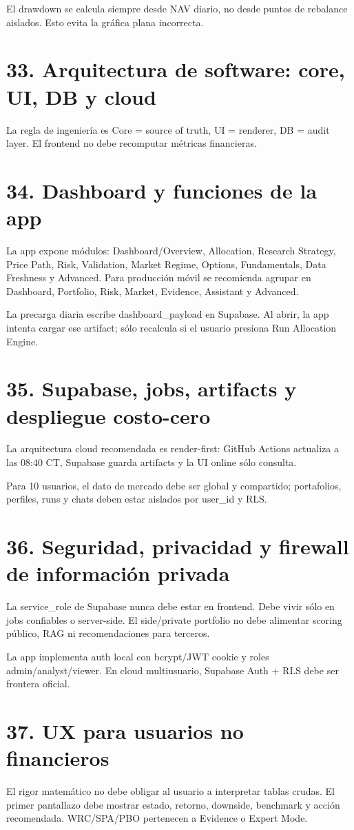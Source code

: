 \documentclass[11pt,letterpaper]{article}
\begin{document}
El drawdown se calcula siempre desde NAV diario, no desde puntos de rebalance aislados. Esto evita la gráfica plana incorrecta.

\section{33. Arquitectura de software: core, UI, DB y cloud}
La regla de ingeniería es Core = source of truth, UI = renderer, DB = audit layer. El frontend no debe recomputar métricas financieras.

\section{34. Dashboard y funciones de la app}
La app expone módulos: Dashboard/Overview, Allocation, Research Strategy, Price Path, Risk, Validation, Market Regime, Options, Fundamentals, Data Freshness y Advanced. Para producción móvil se recomienda agrupar en Dashboard, Portfolio, Risk, Market, Evidence, Assistant y Advanced.

La precarga diaria escribe dashboard\_payload en Supabase. Al abrir, la app intenta cargar ese artifact; sólo recalcula si el usuario presiona Run Allocation Engine.

\section{35. Supabase, jobs, artifacts y despliegue costo-cero}
La arquitectura cloud recomendada es render-first: GitHub Actions actualiza a las 08:40 CT, Supabase guarda artifacts y la UI online sólo consulta.

Para 10 usuarios, el dato de mercado debe ser global y compartido; portafolios, perfiles, runs y chats deben estar aislados por user\_id y RLS.

\section{36. Seguridad, privacidad y firewall de información privada}
La service\_role de Supabase nunca debe estar en frontend. Debe vivir sólo en jobs confiables o server-side. El side/private portfolio no debe alimentar scoring público, RAG ni recomendaciones para terceros.

La app implementa auth local con bcrypt/JWT cookie y roles admin/analyst/viewer. En cloud multiusuario, Supabase Auth + RLS debe ser frontera oficial.

\section{37. UX para usuarios no financieros}
El rigor matemático no debe obligar al usuario a interpretar tablas crudas. El primer pantallazo debe mostrar estado, retorno, downside, benchmark y acción recomendada. WRC/SPA/PBO pertenecen a Evidence o Expert Mode.
\end{document}
